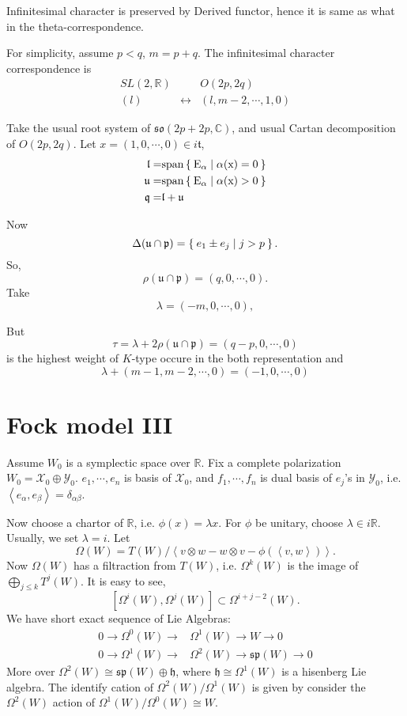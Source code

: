 \documentclass[12pt]{article}
\def\bR{{\mathbb{R}}}
\def\bC{{\mathbb{C}}}
\def\sspan{\rm{span}}
\def\sp{{\mathfrak{sp}}}
\def\inn#1#2{\left\langle{#1},{#2}\right\rangle}
\def\aso{\mathfrak{so}}
\def\fhh{\mathfrak{h}}
\def\fuu{\mathfrak{u}}
\def\fll{\mathfrak{l}}
\def\fpp{\mathfrak{p}}
\def\fqq{\mathfrak{q}}
\def\ftt{\mathfrak{t}}
\def\cxx{\mathcal{X}}
\def\cyy{\mathcal{Y}}
\begin{document}
 
Infinitesimal character is preserved by Derived functor, hence it is same as 
what in the theta-correspondence.

For simplicity, assume $p<q$, $m=p+q$. 
The infinitesimal character correspondence is 
\[
\begin{matrix}
 SL(2,\bR) & & O(2p,2q)\\
 (l) & \leftrightarrow & (l, m-2, \cdots, 1, 0)
\end{matrix}
\]

Take the usual root system of $\aso(2p+2p,\bC)$, and usual Cartan decomposition
of $O(2p,2q)$. 
Let $x = (1, 0,\cdots, 0)\in i\ftt$,
\begin{align*}
\fll =& \sspan \Set{E_\alpha |\alpha(x) =0 }\\
\fuu =& \sspan \Set{E_\alpha |\alpha(x) >0 }\\
\fqq =& \fll+\fuu
\end{align*}

Now 
\[
\Delta(\fuu\cap \fpp) = \Set{e_1\pm e_j|j>p}.
\]
So, 
\[
\rho(\fuu\cap \fpp) = (q, 0, \cdots, 0).
\]
Take
\[
\lambda = (-m, 0, \cdots, 0),
\]

But
\[
\tau = \lambda+2\rho(\fuu\cap\fpp) = (q-p, 0,\cdots, 0)
\]
is the highest weight of $K$-type occure in the both representation and
\[
\lambda + (m-1, m-2, \cdots, 0) = (-1, 0, \cdots, 0) 
\]



\section{Fock model III}
Assume $W_0$ is a symplectic space over $\bR$.
Fix a complete polarization $W_0 = \cxx_0\oplus \cyy_0$.  
$e_1,\cdots, e_n$ is basis of $\cxx_0$, and $f_1,\cdots, f_n$ is dual basis 
of $e_j$'s in $\cyy_0$, i.e. $\inn{e_\alpha}{e_\beta}=\delta_{\alpha\beta}$.

Now choose a chartor of $\bR$, i.e. $\phi(x) = \lambda x$. 
For $\phi$ be unitary, choose $\lambda \in i\bR$. Usually, we set $\lambda=i$. 
Let
\[
\Omega(W) = T(W) / \left\langle v\otimes w - w\otimes v - \phi(\inn{v}{w})\right\rangle.
\]
Now $\Omega(W)$ has a filtraction from $T(W)$, i.e. 
$\Omega^k(W)$ is the image of $\bigoplus_{j\leq k}T^j(W)$.
It is easy to see, 
\[
[\Omega^i(W),\Omega^j(W)] \subset \Omega^{i+j-2}(W).
\]
We have short exact sequence of Lie Algebras:
\begin{align}
0\to \Omega^0(W) \to &\Omega^1(W) \to W \to 0\\
0\to \Omega^1(W) \to &\Omega^2(W) \to \sp(W)\to 0 
\end{align}
More over $\Omega^2(W) \cong \sp(W) \oplus \fhh$, 
where $\fhh\cong \Omega^1(W)$ is a hisenberg Lie algebra.
The identify cation of $\Omega^2(W)/\Omega^1(W)$ is given by
consider the $\Omega^2(W)$ action of $\Omega^1(W)/\Omega^0(W)\cong W$. 
\end{document}
